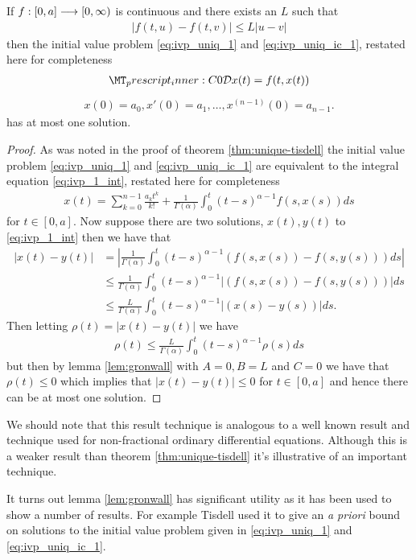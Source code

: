\begin{mdframed}[innertopmargin=10pt]
\begin{lemma}
	If $ f: [0,a] \longrightarrow [0, \infty) $ is continuous and there exists an $ L $ such that
	\begin{align}
	    |f(t,u) - f(t,v)| \leq L|u-v| 
	\end{align}  
	then the initial value problem \eqref{eq:ivp_uniq_1} and \eqref{eq:ivp_uniq_ic_1}, restated here for completeness
	\begin{align*}   
        \prescript{C}{0}{\mathcal{D}}x(t) = f(t,x(t))
    \end{align*}
    \begin{align*}
        x(0) = a_0, x'(0) = a_1, \ldots, x^{(n-1)}(0) = a_{n-1}.
    \end{align*}
    has at most one solution.
\end{lemma}
\end{mdframed}
\begin{proof}
	As was noted in the proof of theorem \ref{thm:unique-tisdell} the initial value problem \eqref{eq:ivp_uniq_1} and \eqref{eq:ivp_uniq_ic_1} are equivalent to the integral equation \eqref{eq:ivp_1_int}, restated here for completeness
	\begin{align}
		x(t) = \sum_{k=0}^{n-1} \frac{a_k t^k}{k!} + \frac{1}{\Gamma(\alpha)} \int_0^t (t-s)^{\alpha-1}f(s,x(s))ds
	\end{align}
	for $ t \in [0,a] $.
	Now suppose there are two solutions, $ x(t), y(t) $ to \eqref{eq:ivp_1_int} then we have that
	\begin{align*}
		|x(t) - y(t)| &= \left| \frac{1}{\Gamma(\alpha)} \int_0^t (t-s)^{\alpha-1}(f(s,x(s)) - f(s,y(s)))ds \right| \\
			&\leq \frac{1}{\Gamma(\alpha)} \int_0^t (t-s)^{\alpha-1}\left| (f(s,x(s)) - f(s,y(s))) \right|ds \\
			&\leq \frac{L}{\Gamma(\alpha)} \int_0^t (t-s)^{\alpha-1}\left| (x(s) - y(s)) \right|ds.
	\end{align*}
	Then letting $ \rho(t) = |x(t) - y(t)| $
	we have 
	\begin{align*}
		\rho(t) \leq \frac{L}{\Gamma(\alpha)} \int_0^t (t-s)^{\alpha-1}\rho(s)ds
	\end{align*}
	but then by lemma \ref{lem:gronwall} with $ A = 0, B = L $ and $ C = 0 $
	we have that $ \rho(t) \leq 0 $ which implies that $ |x(t) - y(t)| \leq 0 $ for $ t \in [0,a] $ and hence there can be at most one solution.
\end{proof}
	
We should note that this result technique is analogous to a well known result and technique used for non-fractional ordinary differential equations. Although this is a weaker result than theorem \ref{thm:unique-tisdell} it's illustrative of an important technique. 

It turns out lemma \ref{lem:gronwall} has significant utility as it has been used to show a number of results. For example Tisdell \cite{Tisdell2012} used it to give an \emph{a priori} bound on solutions to the initial value problem given in \eqref{eq:ivp_uniq_1} and \eqref{eq:ivp_uniq_ic_1}.

\clearpage

